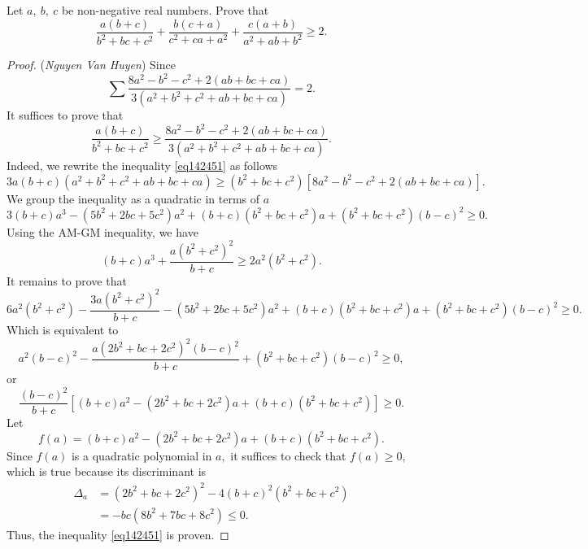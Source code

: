 \documentclass[12pt,a4paper]{book}
\begin{document}
\begin{pro_no_count}
Let $a, \ b, \ c$ be non-negative real numbers. Prove that
\[\frac{a(b+c)}{b^2+bc+c^2}+\frac{b(c+a)}{c^2+ca+a^2}+\frac{c(a+b)}{a^2+ab+b^2} \geqslant 2.\]
\end{pro_no_count}

\begin{proof}
(\textit{Nguyen Van Huyen}) Since
\[\sum \frac{8a^2 - b^2 - c^2 + 2(ab+bc+ca)}{3(a^2+b^2+c^2+ab+bc+ca)} = 2.\]
It suffices to prove that
\begin{equation}\label{eq142451}
\frac{a(b+c)}{b^2+bc+c^2} \geqslant \frac{8a^2 - b^2 - c^2 + 2(ab+bc+ca)}{3(a^2+b^2+c^2+ab+bc+ca)}.
\end{equation}
Indeed, we rewrite the inequality \eqref{eq142451} as follows
\[3a(b+c)(a^2+b^2+c^2+ab+bc+ca) \ge (b^2+bc+c^2)[8a^2 - b^2 - c^2 + 2(ab+bc+ca)].\]
We group the inequality as a quadratic in terms of $a$
\[3(b+c)a^3-(5b^2+2bc+5c^2)a^2+(b+c)(b^2+bc+c^2)a+(b^2+bc+c^2)(b-c)^2 \ge 0.\]
Using the AM-GM inequality, we have
\[(b+c)a^3 + \frac{a(b^2+c^2)^2}{b+c} \ge 2a^2(b^2+c^2).\]
It remains to prove that
\[6a^2(b^2+c^2) - \frac{3a(b^2+c^2)^2}{b+c} - (5b^2+2bc+5c^2)a^2+(b+c)(b^2+bc+c^2)a+(b^2+bc+c^2)(b-c)^2 \ge 0.\]
Which is equivalent to
\[a^2(b-c)^2 - \frac{a(2b^2+bc+2c^2)^2(b-c)^2}{b+c} + (b^2+bc+c^2)(b-c)^2 \ge 0,\]
or
\[\frac{(b-c)^2}{b+c}[(b+c)a^2 - (2b^2+bc+2c^2)a + (b+c)(b^2+bc+c^2)] \ge 0.\]
Let
\[f(a) = (b+c)a^2 - (2b^2+bc+2c^2)a + (b+c)(b^2+bc+c^2).\]
Since $f(a)$ is a quadratic polynomial in $a,$ it suffices to check that $f(a) \ge 0,$ which is true because its discriminant is
\[\begin{aligned} 
\Delta_{a} &= (2b^2+bc+2c^2)^2 - 4(b+c)^2(b^2+bc+c^2) \\
& = - bc(8b^2+7bc+8c^2) \leqslant 0.
\end{aligned}\]
Thus, the inequality \eqref{eq142451} is proven.
\end{proof}
\end{document}
